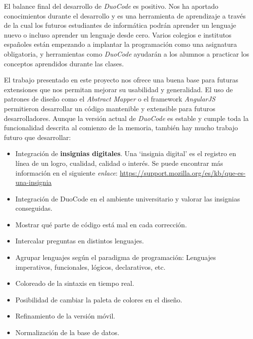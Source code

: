 El balance final del desarrollo de \textit{DuoCode} es positivo. Nos ha aportado conocimientos durante el desarrollo y es una herramienta de aprendizaje a través de la cual los futuros estudiantes de informática podrán aprender un lenguaje nuevo o incluso aprender un lenguaje desde cero.
Varios colegios e institutos españoles están empezando a implantar la programación como una asignatura obligatoria, y herramientas como \textit{DuoCode} ayudarán a los alumnos a practicar los conceptos aprendidos durante las clases.

El trabajo presentado en este proyecto nos ofrece una buena base para futuras extensiones que nos permitan mejorar su usabilidad y generalidad. El uso de patrones de diseño como el \textit{Abstract Mapper} o el framework \textit{AngularJS} permitieron desarrollar un código mantenible y extensible para futuros desarrolladores. Aunque la versión actual de \textit{DuoCode} es estable y cumple toda la funcionalidad descrita al comienzo de la memoria, también hay mucho trabajo futuro que desarrollar:
\begin{itemize}
\item Integración de \textbf{insignias digitales}. Una `insignia digital' es el registro en línea de un logro, cualidad, calidad o interés. Se puede encontrar más información en el siguiente \textit{enlace}: \url{https://support.mozilla.org/es/kb/que-es-una-insignia}

\item Integración de DuoCode en el ambiente universitario y valorar las insignias conseguidas.

\item Mostrar qué parte de código está mal en cada corrección.

\item Intercalar preguntas en distintos lenguajes.

\item Agrupar lenguajes según el paradigma de programación: Lenguajes imperativos, funcionales, lógicos, declarativos, etc.

\item Coloreado de la sintaxis en tiempo real.

\item Posibilidad de cambiar la paleta de colores en el diseño.

\item Refinamiento de la versión móvil.

\item Normalización de la base de datos.

\end{itemize}